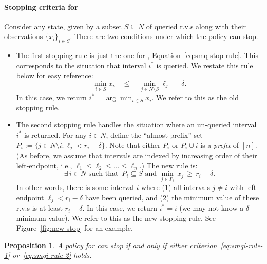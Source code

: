 \documentclass[11pt]{article}
\newtheorem{prop}[thm]{Proposition}
\theoremstyle{remark}
\theoremstyle{plain}
\theoremstyle{remark}
\begin{document}
\paragraph{Stopping criteria for \smqi} 
Consider any state, given by a subset $S\subseteq N$ of queried r.v.s along with their observations $\{x_i\}_{i\in S}$. There are two conditions under which the \smqi policy can stop.
\begin{itemize}
    \item The first stopping rule is just the one for \smq, Equation~\eqref{eq:smq-stop-rule}. This corresponds to the situation that interval $i^*$ is queried. We restate this rule below for easy reference:  
\begin{equation}
    \label{eq:smqi-rule-1}
 \min_{i\in S} x_i\quad \le \quad \min_{j\in N\setminus S} \ell_j \,+\, \delta.
 \end{equation}
  In this case, we return $i^*=\arg\min_{i\in S} x_i$. We refer to this as the old stopping rule.

\item The second stopping rule handles the situation where an un-queried interval $i^*$ is returned. For any $i\in N$, define the ``almost prefix'' set $P_i:=\{j \in N\setminus i : \ell_j < r_i-\delta\}$. Note that either $P_i$ or $P_i\cup i$ is  a {\em prefix} of $[n]$. (As before, we assume that  intervals are indexed by increasing order of their left-endpoint, i.e.,  $\ell_1 \leq \ell_2\leq \dots \leq  \ell_n$.)     The new rule is:
\begin{equation}
    \label{eq:smqi-rule-2}
\exists \, i\in N  \text{ such that } \,  P_i \subseteq S \text{ and } \min_{j\in P_i} \, x_j \,\ge\, r_i-\delta .
\end{equation}
In other words, there is some  interval $i$ where (1) all intervals $j\ne i$ with left-endpoint $\ell_j<r_i-\delta$ have been queried, and (2) the minimum  value of these r.v.s is at least   $r_i-\delta$. In this case, we return $i^*=i$ (we may not know a $\delta$-minimum value).  We refer to this as the new stopping rule. See Figure~\ref{fig:new-stop} for an example. 
\end{itemize}


\begin{prop}
    A policy for \smqi can stop if and only if either criterion~\eqref{eq:smqi-rule-1} or~\eqref{eq:smqi-rule-2} holds. 
\end{prop}
\end{document}
